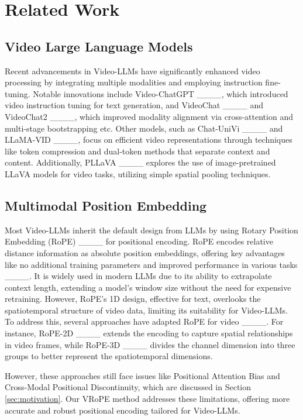 \section{Related Work}
\subsection{Video Large Language Models}
Recent advancements in Video-LLMs have significantly enhanced video processing by integrating multiple modalities and employing instruction fine-tuning. Notable innovations include Video-ChatGPT ____, which introduced video instruction tuning for text generation, and VideoChat ____ and VideoChat2 ____, which improved modality alignment via cross-attention and multi-stage bootstrapping etc. Other models, such as Chat-UniVi ____ and LLaMA-VID ____, focus on efficient video representations through techniques like token compression and dual-token methods that separate context and content. Additionally, PLLaVA ____ explores the use of image-pretrained LLaVA models for video tasks, utilizing simple spatial pooling techniques.

\subsection{Multimodal Position Embedding}
Most Video-LLMs inherit the default design from LLMs by using Rotary Position Embedding (RoPE) ____ for positional encoding. RoPE encodes relative distance information as absolute position embeddings, offering key advantages like no additional training parameters and improved performance in various tasks ____. It is widely used in modern LLMs due to its ability to extrapolate context length, extending a model's window size without the need for expensive retraining. However, RoPE's 1D design, effective for text, overlooks the spatiotemporal structure of video data, limiting its suitability for Video-LLMs. To address this, several approaches have adapted RoPE for video ____. For instance, RoPE-2D ____ extends the encoding to capture spatial relationships in video frames, while RoPE-3D ____ divides the channel dimension into three groups to better represent the spatiotemporal dimensions.

However, these approaches still face issues like Positional Attention Bias and Cross-Modal Positional Discontinuity, which are discussed in Section \ref{sec:motivation}. Our VRoPE method addresses these limitations, offering more accurate and robust positional encoding tailored for Video-LLMs.